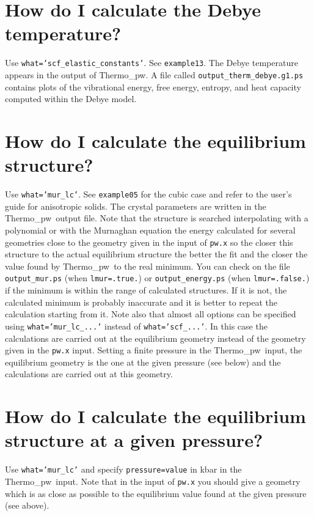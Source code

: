 \documentclass[12pt,a4paper,twoside]{report}
\def\thermo{{\sc Thermo}\_{\sc pw}}
\begin{document}
\newpage
{\color{coral}\section{How do I calculate the Debye temperature?}}
\color{black}
Use \texttt{what='scf\_elastic\_constants'}. See \texttt{example13}. The
Debye temperature appears in the output of \thermo. A file called
\texttt{output\_therm\_debye.g1.ps} contains plots of the vibrational
energy, free energy, entropy, and heat capacity computed within the 
Debye model.

\newpage
{\color{coral}\section{How do I calculate the equilibrium structure?}}
\color{black}
Use \texttt{what='mur\_lc'}. See \texttt{example05} for the cubic case
and refer to the user's
guide for anisotropic solids. The crystal
parameters are written in the \thermo\ output file. Note that the structure is
searched interpolating with a polynomial or with the Murnaghan
equation the energy calculated for several geometries close to the geometry 
given in the input of \texttt{pw.x} so the closer this structure to the 
actual equilibrium structure the better the fit and the
closer the value found by \thermo\ to the real minimum. 
You can check on the file
\texttt{output\_mur.ps} (when \texttt{lmur=.true.}) or 
\texttt{output\_energy.ps} (when \texttt{lmur=.false.}) if the minimum
is within the range of calculated structures. If it is not, 
the calculated minimum is probably inaccurate and it is better to repeat the 
calculation starting from it.
Note also that almost all options can be specified using
\texttt{what='mur\_lc\_...'} instead of \texttt{what='scf\_...'}.
In this case the calculations are carried out at the equilibrium geometry 
instead of the geometry given in the \texttt{pw.x} input. 
Setting a finite pressure in the \thermo\ input, 
the equilibrium geometry is the one at the given pressure (see below)
and the calculations are carried out at this geometry.

\newpage
{\color{coral}\section{How do I calculate the equilibrium structure 
at a given pressure?}}
\color{black}
Use \texttt{what='mur\_lc'} and specify \texttt{pressure=value} in kbar in the
\thermo\ input. Note that in the input of \texttt{pw.x} you should 
give a geometry which is as close as possible to the equilibrium value
found at the given pressure (see above).
\end{document}
